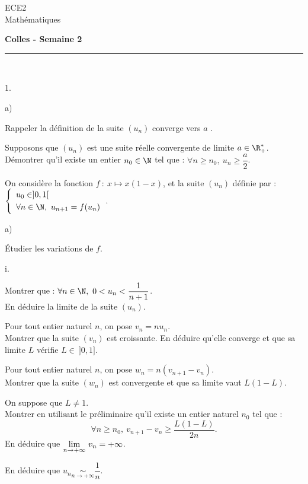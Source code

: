 \documentclass[11pt]{article}%
\begin{document}
\begin{flushleft}
ECE2 \\
Mathématiques
\end{flushleft}

\begin{center}
\textbf{\Large{Colles - Semaine 2}}
\end{center}

\hrule

\vspace*{0,2cm}
 
\begin{exercice}~
 \begin{noliste}{1.}
 \item \begin{noliste}{a)}
 	\item Rappeler la définition de \og la suite $(u_n)$ converge 
 vers $a$ \fg{}.
 	\item Supposons que $(u_n)$ est une suite réelle convergente de 
 limite $a \in \R_+^*$.\\
 	Démontrer qu'il existe un entier $n_0 \in \N$ tel que : $ 
 \forall n \geq n_0, \ u_n \geq \dfrac{a}{2}$.
 	\end{noliste}
 \item On considère la fonction $f \ : \ x \mapsto x(1-x)$, et la 
suite 
 $(u_n)$ définie par : $ \left\{ 
 \begin{array}{l}
 u_0 \in ]0,1[
 \\[.1cm]
 \forall n \in \N, \ u_{n+1} =f(u_n)
 \end{array} 
 \right.$.
 \begin{noliste}{a)}
 \item \'Etudier les variations de $f$.
 \item \begin{noliste}{i.}
 	\item Montrer que : $ \forall n \in \N, \ 0<u_n< 
 \dfrac{1}{n+1}$.\\
 	En déduire la limite de la suite $(u_n)$.
 	\item Pour tout entier naturel $n$, on pose $v_n=nu_n$.\\
 	Montrer que la suite $(v_n)$ est croissante. En déduire qu'elle 
 converge et que sa limite $L$ vérifie $L \in \ ]0,1]$.
 	
 	\item Pour tout entier naturel $n$, on pose 
 $w_n=n(v_{n+1}-v_n)$.\\
 	Montrer que la suite $(w_n)$ est convergente et que sa limite 
 vaut $L(1-L)$.
 	\end{noliste}
 \end{noliste}
 \item On suppose que $L \neq 1$.\\
 Montrer en utilisant le préliminaire qu'il existe un entier naturel 
 $n_0$ tel que :
 \[
 \forall n \geq n_0, \ v_{n+1} -v_n \geq \dfrac{L(1-L)}{2n}.
 \]
 En déduire que $ {\displaystyle \lim_{n \to + \infty} \ } v_n = + \infty$.
 
 \item En déduire que $ u_n \underset{n \to + \infty}{\sim} 
 \dfrac{1}{n}$.
 \end{noliste}
 \end{exercice}
 
\end{document}
